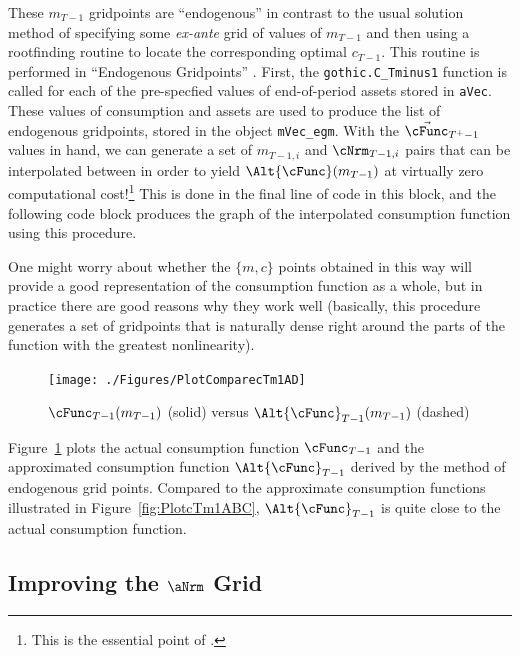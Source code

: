 \documentclass[titlepage, headings=optiontotocandhead]{\econtex}
\begin{document}
These ${m}_{T-1}$ gridpoints are ``endogenous'' in contrast to the usual solution method of
specifying some \textit{ex-ante} grid of values of ${m}_{T-1}$ and then using a rootfinding
routine to locate the corresponding optimal ${c}_{T-1}$. This routine is performed in ``Endogenous Gridpoints''
. First, the \texttt{gothic.C\_Tminus1} function is called for each of the pre-specfied
values of end-of-period assets stored in \texttt{aVec}. These values of consumption and assets
are used to produce the list of endogenous gridpoints, stored in the object
\texttt{mVec\_egm}. With the $\vec{\cFunc}_{T^{+}-1}$ values in hand, we can generate a set of ${m}_{T-1,i}$ and ${\cNrm}_{T-1,i}$
pairs that can be interpolated between in order to yield
$\Alt{\cFunc}({m}_{T-1})$ at virtually zero computational cost!\footnote{This is
  the essential point of \cite{carrollEGM}.} This is done in the final line of code in this block, and the following
code block produces the graph of the interpolated consumption function using this procedure.

One might worry about whether the $\{{m},{c}\}$ points obtained in this way will provide a
good representation of the consumption function as a whole, but in
practice there are good reasons why they work well (basically, this
procedure generates a set of gridpoints that is naturally dense right
around the parts of the function with the greatest nonlinearity).
\hypertarget{PlotComparecTm1AD}{}
\begin{figure}
  \centerline{\texttt{[image: ./Figures/PlotComparecTm1AD]}}
  \caption{$\cFunc_{T-1}({m}_{T-1})$ (solid) versus $\Alt{\cFunc}_{T-1}({m}_{T-1})$ (dashed)}
  \label{fig:ComparecTm1AD}
\end{figure}
Figure~\ref{fig:ComparecTm1AD} plots the actual consumption function
${\cFunc}_{T-1}$ and the approximated consumption function $\Alt{\cFunc}_{T-1}$
derived by the method of endogenous grid points. Compared to the approximate consumption
functions illustrated in Figure~\ref{fig:PlotcTm1ABC}, $\Alt{\cFunc}_{T-1}$ is quite close
to the actual consumption function.



\hypertarget{Improving-the-a-Grid}{}
\subsection{Improving the $\aNrm$ Grid}
\end{document}
